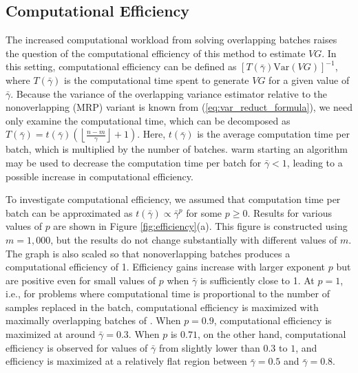 \documentclass[12pt]{article}
\newcommand{\var}[1]{\mathrm{Var} \left( #1 \right)}
\newcommand{\nb}{\left\lfloor\tfrac{n-m}{\gamma}\right\rfloor+1}
\newcommand{\gammab}{\bar{\gamma}}
\begin{document}
\subsection{Computational Efficiency}
\label{ssec:compeff}


The increased computational workload from solving overlapping batches raises the question of the computational efficiency of this method to estimate $VG$.
In this setting, computational efficiency can be defined as $[T(\gammab)\var{VG}]^{-1}$, where $T(\gammab)$ is the computational time spent to generate $VG$ for a given value of $\gammab$.
Because the variance of the overlapping variance estimator relative to the nonoverlapping (MRP) variant is known from (\ref{eq:var_reduct_formula}), we need only examine the computational time, which can be decomposed as $T(\gammab) = t(\gammab)\left(\nb\right)$. 
Here, $t(\gammab)$ is the average computation time per batch, which is multiplied by the number of batches.
warm starting an algorithm may be used to decrease the computation time per batch for $\gammab < 1$, leading to a possible increase in computational efficiency. 

To investigate computational efficiency, we assumed that computation time per batch can be approximated as $t(\gammab) \propto \gammab^p$ for some $p \geq 0$.
Results for various values of $p$ are shown in Figure \ref{fig:efficiency}(a). 
This figure is constructed using $m = 1,000$, but the results do not change substantially with different values of $m$.
The graph is also scaled so that nonoverlapping batches produces a computational efficiency of 1. 
Efficiency gains increase with larger exponent $p$ but are positive even for small values of $p$ when $\gammab$ is sufficiently close to 1.
At $p=1$, i.e., for problems where computational time is proportional to the number of samples replaced in the batch, computational efficiency is maximized with maximally overlapping batches of \cite{Meketon1984}.
When $p=0.9$, computational efficiency is maximized at around $\gammab=0.3$.
When $p$ is $0.71$, on the other hand, computational efficiency is observed for values of $\gammab$ from slightly lower than $0.3$ to $1$, and efficiency is maximized at a relatively flat region between $\gammab=0.5$ and $\gammab=0.8$.
\end{document}
